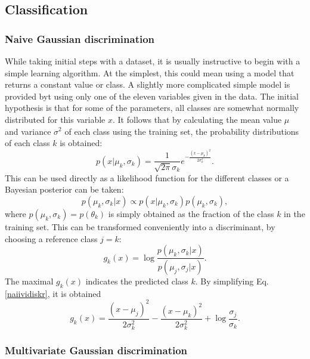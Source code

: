 \documentclass[twoside]{article}
\begin{document}
\begin{multicols}{2}
\subsection{Classification}

\subsubsection{Naive Gaussian discrimination} \label{method:naiivig}

While taking initial steps with a dataset, it is usually instructive to begin with a simple
learning algorithm. At the simplest, this could mean using a model that returns a constant value or
class. A slightly more complicated simple model is provided byt using only one of the eleven variables
given in the data. The initial hypothesis is that for some of the parameters, all classes are somewhat
normally distributed for this variable $x$. It follows that by calculating the mean value 
$\mu$ and variance $\sigma^2$ of each class using the training set, the probability distributions of 
each class $k$ is obtained:
\begin{equation}
 p(x|\mu_k,\sigma_k) = \frac{1}{\sqrt{2\pi} \sigma_k} e^{-\frac{(x-\mu_k)^2}{2\sigma_k^2}}.
\end{equation}
This can be used directly as a likelihood function for the different classes or a Bayesian posterior
can be taken:
\begin{equation}\label{posterior}
 p(\mu_k,\sigma_k|x) \propto p(x|\mu_k,\sigma_k) p(\mu_k,\sigma_k),
\end{equation}
where $p(\mu_k,\sigma_k) = p(\theta_k)$ is simply obtained as the fraction of the class $k$ in the 
training set. This can be transformed conveniently into a discriminant, by choosing a reference
class $j = k$:
\begin{equation}\label{naiividiskr}
 g_k(x) = \log \frac{p(\mu_k,\sigma_k|x)}{p(\mu_j,\sigma_j|x)}.
\end{equation}
The maximal $g_k(x)$ indicates the predicted class $k$. By simplifying Eq. \eqref{naiividiskr},
it is obtained
\begin{equation}\label{naiividiskr2}
 g_k(x) = \frac{(x-\mu_j)^2}{2\sigma_k^2}-\frac{(x-\mu_k)^2}{2\sigma_k^2} + 
 \log \frac{\sigma_j}{\sigma_k}.
\end{equation}


\subsubsection{Multivariate Gaussian discrimination}\label{method:multig}


\end{multicols}
\end{document}
